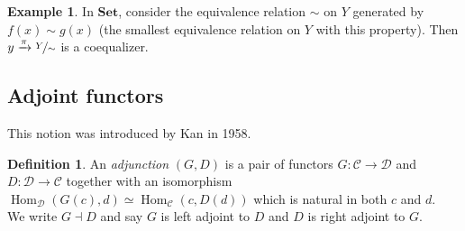 \documentclass{article}
\newcommand{\cat}{\mathcal{C}}
\newcommand{\catt}{\mathcal{D}}
\newcommand{\Set}{\mathbf{Set}}
\DeclareMathOperator{\Hom}{Hom}
\theoremstyle{plain}
\theoremstyle{definition}
\newtheorem{definition}[theorem]{Definition}
\newtheorem{example}[theorem]{Example}
\theoremstyle{remark}
\begin{document}
\begin{example}
    In $\Set$, consider the equivalence relation $\sim$ on $Y$ generated by $f(x)\sim g(x)$ (the smallest equivalence relation on $Y$ with this property). Then $y \xrightarrow{\pi} \nicefrac{Y}{\sim}$ is a coequalizer.
\end{example}

\subsection{Adjoint functors}

This notion was introduced by Kan in 1958.

\begin{definition}
    An \emph{adjunction} $(G,D)$ is a pair of functors $G : \cat \to \catt$ and $D : \catt \to \cat$ together with an isomorphism $\Hom_\catt (G(c),d) \simeq \Hom_\cat (c,D(d))$ which is natural in both $c$ and $d$. \\
    We write $G \dashv D$ and say $G$ is left adjoint to $D$ and $D$ is right adjoint to $G$.
\end{definition}
\end{document}
